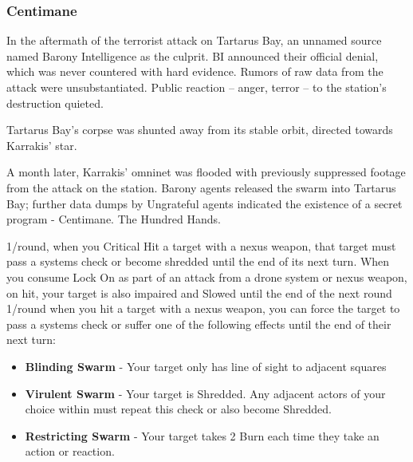 \subsubsection{Centimane}

\begin{talent}
{In the aftermath of the terrorist attack on Tartarus Bay, an unnamed source named Barony Intelligence as the culprit. BI announced their official denial, which was never countered with hard evidence. Rumors of raw data from the attack were unsubstantiated. Public reaction -- anger, terror -- to the station’s destruction quieted.

Tartarus Bay’s corpse was shunted away from its stable orbit, directed towards Karrakis’ star.

A month later, Karrakis’ omninet was flooded with previously suppressed footage from the attack on the station. Barony agents released the swarm into Tartarus Bay; further data dumps by Ungrateful agents indicated the existence of a secret program - Centimane. The Hundred Hands.}

1/round, when you Critical Hit a target with a nexus weapon, that target must pass a systems check or become shredded until the end of its next turn.
When you consume Lock On as part of an attack from a drone system or nexus weapon, on hit, your target is also impaired and Slowed until the end of the next round
1/round when you hit a target with a nexus weapon, you can force the target to pass a systems check or suffer one of the following effects until the end of their next turn: 
\begin{itemize}
\item \textbf{Blinding Swarm} - Your target only has line of sight to adjacent squares 
\item \textbf{Virulent Swarm} - Your target is Shredded. Any adjacent actors of your choice within must repeat this check or also become Shredded. 
\item \textbf{Restricting Swarm} - Your target takes 2 Burn each time they take an action or reaction.
\end{itemize}
\end{talent}
